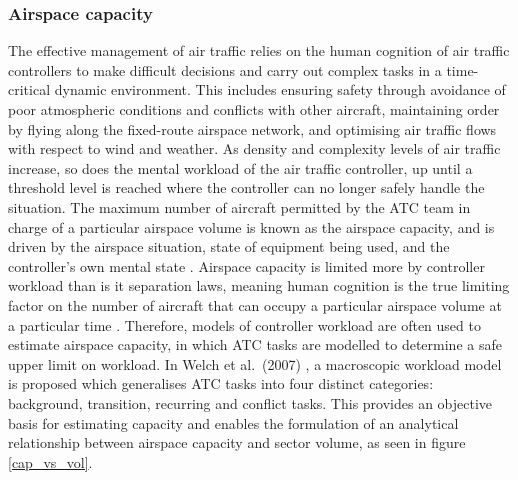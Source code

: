 \subsubsection{Airspace capacity}
The effective management of air traffic relies on the human cognition of air traffic controllers to make difficult decisions and carry out complex tasks in a time-critical dynamic environment. This includes ensuring safety through avoidance of poor atmospheric conditions and conflicts with other aircraft, maintaining order by flying along the fixed-route airspace network, and optimising air traffic flows with respect to wind and weather. As density and complexity levels of air traffic increase, so does the mental workload of the air traffic controller, up until a threshold level is reached where the controller can no longer safely handle the situation. The maximum number of aircraft permitted by the ATC team in charge of a particular airspace volume is known as the airspace capacity, and is driven by the airspace situation, state of equipment being used, and the controller's own mental state \cite{Majumdar2004}. Airspace capacity is limited more by controller workload than is it separation laws, meaning human cognition is the true limiting factor on the number of aircraft that can occupy a particular airspace volume at a particular time \cite{Welch2007, Bilimoria1996}. Therefore, models of controller workload are often used to estimate airspace capacity, in which ATC tasks are modelled to determine a safe upper limit on workload. In Welch et al.\ (2007) \cite{Welch2007}, a macroscopic workload model is proposed which generalises ATC tasks into four distinct categories: background, transition, recurring and conflict tasks. This provides an objective basis for estimating capacity and enables the formulation of an analytical relationship between airspace capacity and sector volume, as seen in figure \ref{cap_vs_vol}.


